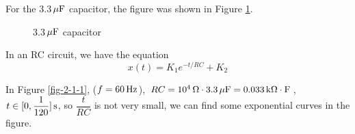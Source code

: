 \documentclass{article}
\newcommand{\unit}[1]{{\rm\,#1}}
\begin{document}
For the 3.3$\unit{\mu F}$ capacitor, the figure was shown in Figure \ref{fig-2-1}.

\begin{figure}[htbp]
	\centering
	\caption{3.3$\unit{\mu F}$ capacitor}
	\label{fig-2-1}
\end{figure}

In an RC circuit, we have the equation
$$x(t)=K_1e^{-t/RC}+K_2$$

In Figure \ref{fig-2-1-1}, ($f=60\unit{Hz}$), $RC=10^4\unit{\Omega}\cdot3.3\unit{\mu F}=0.033\unit{k\Omega\cdot F}$, $t\in[0,\dfrac{1}{120}]\unit{s}$, so $\dfrac{t}{RC}$ is not very small, we can find some exponential curves in the figure.\\[-0.5em]
\end{document}
